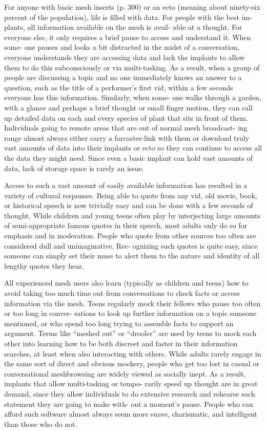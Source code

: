 For anyone with basic mesh inserts (p. 300) or an ecto 
(meaning about ninety-six percent of the population), 
life is filled with data. For people with the best im-
plants, all information available on the mesh is avail-
able at a thought. For everyone else, it only requires a 
brief pause to access and understand it. When some-
one pauses and looks a bit distracted in the midst of a 
conversation, everyone understands they are accessing 
data and lack the implants to allow them to do this 
subconsciously or via multi-tasking. As a result, when 
a group of people are discussing a topic and no one 
immediately knows an answer to a question, such as 
the title of a performer's first vid, within a few seconds 
everyone has this information. Similarly, when some-
one walks through a garden, with a glance and 
perhaps a brief thought or small finger motion, they 
can call up detailed data on each and every species of 
plant that sits in front of them. Individuals going to 
remote areas that are out of normal mesh broadcast-
ing range almost always either carry a farcaster-link 
with them or download truly vast amounts of data 
into their implants or ecto so they can continue to 
access all the data they might need. Since even a basic 
implant can hold vast amounts of data, lack of storage 
space is rarely an issue.

Access to such a vast amount of easily available 
information has resulted in a variety of cultural 
responses. Being able to quote from any vid, old movie, 
book, or historical speech is now trivially easy and 
can be done with a few seconds of thought. While 
children and young teens often play by interjecting 
large amounts of semi-appropriate famous quotes in 
their speech, most adults only do so for emphasis and 
in moderation. People who quote from other sources 
too often are considered dull and unimaginative. Rec-
ognizing such quotes is quite easy, since someone can 
simply set their muse to alert them to the nature and 
identity of all lengthy quotes they hear.

All experienced mesh users also learn (typically as 
children and teens) how to avoid taking too much 
time out from conversations to check facts or access 
information via the mesh. Teens regularly mock their 
fellows who pause too often or too long in conver-
sations to look up further information on a topic 
someone mentioned, or who spend too long trying 
to assemble facts to support an argument. Terms like 
``meshed out'' or ``drooler'' are used by teens to mock 
each other into learning how to be both discreet and 
faster in their information searches, at least when also 
interacting with others. While adults rarely engage 
in the same sort of direct and obvious mockery, 
people who get too lost in casual or conversational 
meshbrowsing are widely viewed as socially inept. As 
a result, implants that allow multi-tasking or tempo-
rarily speed up thought are in great demand, since 
they allow individuals to do extensive research and 
rehearse each statement they are going to make with-
out a moment's pause. People who can afford such 
software almost always seem more suave, charismatic, 
and intelligent than those who do not.

